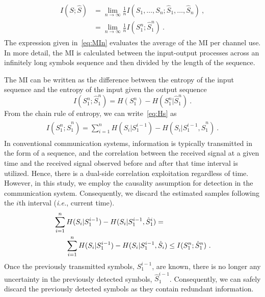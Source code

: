 \documentclass[journal]{IEEEtranTCOM}
\begin{document}
\begin{align}
\begin{split}
    I(S;\hat{S}) &= \lim_{n\to\infty}\frac{1}{n}I(S_{1},\ldots,S_{n};\hat{S}_{1},\ldots,\hat{S}_{n})~,\\&
    = \lim_{n\to\infty}\frac{1}{n}I(S_{1}^{n};\hat{S}_{1}^{n})~.
    \label{eq:MIn}
    \end{split}
\end{align}
The expression given in~\eqref{eq:MIn} evaluates the average of the MI per channel use. In more detail, the MI is calculated between the input-output processes across an infinitely long symbols sequence and then divided by the length of the sequence. %
\par The MI can be written as the difference between the entropy of the input sequence and the entropy of the input given the output sequence
\begin{equation}
    I(S_{1}^{n};\hat{S}_{1}^{n}) = H(S_{1}^{n}) - H(S_{1}^{n}|\hat{S}_{1}^{n})~.
    \label{eq:Hs}
\end{equation}
From the chain rule of entropy, we can write~\eqref{eq:Hs} as
\begin{align}
    \begin{split}
    I(S_{1}^{n};\hat{S}_{1}^{n}) = \sum_{i=1}^{n} H(S_{i}|S_{1}^{i-1}) - H(S_{i}|S_{1}^{i-1},\hat{S}_{1}^{n})~.
    \end{split}
\end{align}
In conventional communication systems, information is typically transmitted in the form of a sequence, and the correlation between the received signal at a given time and the received signal observed before and after that time interval is utilized. Hence, there is a dual-side correlation exploitation regardless of time. However, in this study, we employ the causality assumption for detection in the communication system. Consequently, we discard the estimated samples following the $i$th interval (\textit{i.e.}, current time).
\begin{align}
    \begin{split}
    &\sum_{i=1}^{n} H(S_{i}|S_{1}^{i-1}) - H(S_{i}|S_{1}^{i-1},\hat{S}_{1}^{i})=\\& \hspace{0.6cm} \sum_{i=1}^{n} H(S_{i}|S_{1}^{i-1}) - H(S_{i}|S_{1}^{i-1},\hat{S}_{i})\leq I(S_{1}^{n};\hat{S}_{1}^{n})  ~.
    \end{split}
\end{align}
Once the previously transmitted symbols, $S_{1}^{i-1}$, are known, there is no longer any uncertainty in the previously detected symbols, $\hat{S}_{1}^{i-1}$. Consequently, we can safely discard the previously detected symbols as they contain redundant information.
\end{document}
